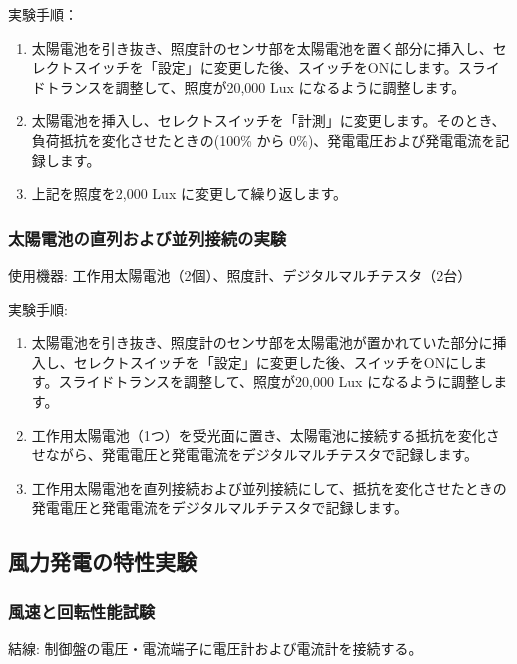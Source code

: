 \documentclass[a4paper,11pt,xelatex,ja=standard]{bxjsarticle}
\begin{document}
            実験手順：
            \begin{enumerate}
                \item 太陽電池を引き抜き、照度計のセンサ部を太陽電池を置く部分に挿入し、セレクトスイッチを「設定」に変更した後、スイッチをONにします。スライドトランスを調整して、照度が20,000 Lux になるように調整します。
                \item 太陽電池を挿入し、セレクトスイッチを「計測」に変更します。そのとき、負荷抵抗を変化させたときの(100\% から 0\%)、発電電圧および発電電流を記録します。
                \item 上記を照度を2,000 Lux に変更して繰り返します。
            \end{enumerate}

        \subsubsection{太陽電池の直列および並列接続の実験}
            使用機器: 工作用太陽電池（2個）、照度計、デジタルマルチテスタ（2台）

            実験手順:
            \begin{enumerate}
                \item 太陽電池を引き抜き、照度計のセンサ部を太陽電池が置かれていた部分に挿入し、セレクトスイッチを「設定」に変更した後、スイッチをONにします。スライドトランスを調整して、照度が20,000 Lux になるように調整します。
                \item 工作用太陽電池（1つ）を受光面に置き、太陽電池に接続する抵抗を変化させながら、発電電圧と発電電流をデジタルマルチテスタで記録します。
                \item 工作用太陽電池を直列接続および並列接続にして、抵抗を変化させたときの発電電圧と発電電流をデジタルマルチテスタで記録します。
            \end{enumerate}


    \subsection{風力発電の特性実験}
        \subsubsection{風速と回転性能試験}
            結線: 制御盤の電圧・電流端子に電圧計および電流計を接続する。
    
\end{document}
